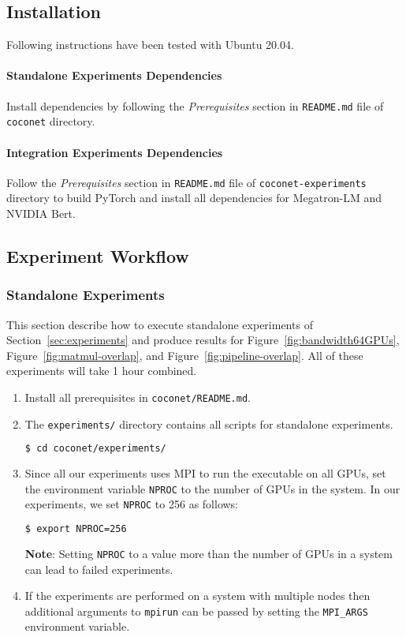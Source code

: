 \subsection{Installation}
Following instructions have been tested with Ubuntu 20.04.

\paragraph{Standalone Experiments Dependencies} Install dependencies by following the \textit{Prerequisites} section in \texttt{README.md} file of \texttt{coconet} directory.

\paragraph{Integration Experiments Dependencies} Follow the \textit{Prerequisites} section in \texttt{README.md} file of \texttt{coconet-experiments} directory to build PyTorch and install all dependencies for Megatron-LM and NVIDIA Bert.

\subsection{Experiment Workflow}
\subsubsection{Standalone Experiments}
\label{appendix:sec-standalone}
This section describe how to execute standalone experiments of Section~\ref{sec:experiments} and produce results for Figure~\ref{fig:bandwidth64GPUs}, Figure~\ref{fig:matmul-overlap}, and Figure~\ref{fig:pipeline-overlap}.
All of these experiments will take 1 hour combined.
\begin{enumerate}
  \item Install all \tool prerequisites in \texttt{coconet/README.md}.
  \item The \texttt{experiments/} directory contains all scripts for standalone experiments.

{\footnotesize
\begin{lstlisting}[language=bash]
$ cd coconet/experiments/
\end{lstlisting}
}

  \item Since all our experiments uses MPI to run the executable on all GPUs,  set the environment variable \texttt{NPROC} to the number of GPUs in the system. In our experiments, we set \texttt{NPROC} to 256 as follows:
  
  {\footnotesize
\begin{lstlisting}[language=bash]
$ export NPROC=256
\end{lstlisting}
}
\textbf{Note}: Setting \texttt{NPROC} to a value more than the number of GPUs in a system can lead to failed experiments.

  \item If the experiments are performed on a system with multiple nodes then additional arguments to \texttt{mpirun} can be passed by setting the \texttt{MPI\_ARGS} environment variable.
\end{enumerate}

